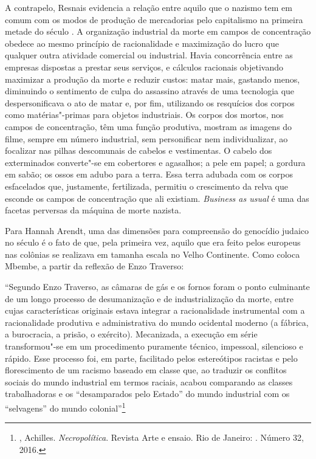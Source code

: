 A contrapelo, Resnais evidencia a relação entre aquilo que o nazismo tem
em comum com os modos de produção de mercadorias pelo capitalismo na
primeira metade do século . A organização industrial da morte em
campos de concentração obedece ao mesmo princípio de racionalidade e
maximização do lucro que qualquer outra atividade comercial ou
industrial. Havia concorrência entre as empresas dispostas a prestar
seus serviços, e cálculos racionais objetivando maximizar a produção da
morte e reduzir custos: matar mais, gastando menos, diminuindo o
sentimento de culpa do assassino através de uma tecnologia que
despersonificava o ato de matar e, por fim, utilizando os resquícios dos
corpos como matérias"-primas para objetos industriais. Os corpos dos
mortos, nos campos de concentração, têm uma função produtiva, mostram as
imagens do filme, sempre em número industrial, sem personificar nem
individualizar, ao focalizar nas pilhas descomunais de cabelos e
vestimentas. O cabelo dos exterminados converte"-se em cobertores e
agasalhos; a pele em papel; a gordura em sabão; os ossos em adubo para a
terra. Essa terra adubada com os corpos esfacelados que, justamente,
fertilizada, permitiu o crescimento da relva que esconde os campos de
concentração que ali existiam. \emph{Business as usual} é uma das
facetas perversas da máquina de morte nazista.

Para Hannah Arendt, uma das dimensões para compreensão do genocídio
judaico no século  é o fato de que, pela primeira vez, aquilo que era
feito pelos europeus nas colônias se realizava em tamanha escala no
Velho Continente. Como coloca Mbembe, a partir da reflexão de Enzo
Traverso:

``Segundo Enzo Traverso, as câmaras de gás e os fornos foram o ponto
culminante de um longo processo de desumanização e de industrialização
da morte, entre cujas características originais estava integrar a
racionalidade instrumental com a racionalidade produtiva e
administrativa do mundo ocidental moderno (a fábrica, a burocracia, a
prisão, o exército). Mecanizada, a execução em série transformou"-se em
um procedimento puramente técnico, impessoal, silencioso e rápido. Esse
processo foi, em parte, facilitado pelos estereótipos racistas e pelo
florescimento de um racismo baseado em classe que, ao traduzir os
conflitos sociais do mundo industrial em termos raciais, acabou
comparando as classes trabalhadoras e os ``desamparados pelo Estado'' do
mundo industrial com os ``selvagens'' do mundo colonial''\footnote{,
  Achilles. \emph{Necropolítica}. Revista Arte e ensaio. Rio de Janeiro:
  . Número 32, 2016.}


